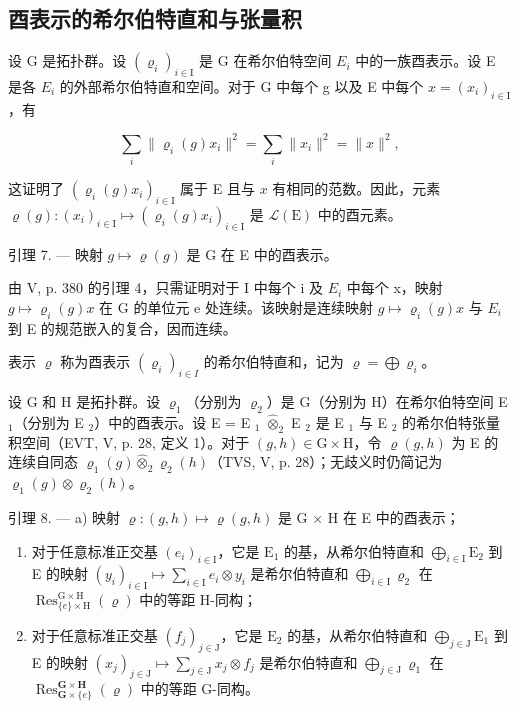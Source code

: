 \subsection{酉表示的希尔伯特直和与张量积}

设 G 是拓扑群。设 \((\varrho_{i})_{i\in\mathrm{I}}\) 是 G 在希尔伯特空间 \(E_{i}\) 中的一族酉表示。设 E 是各 \(E_{i}\) 的外部希尔伯特直和空间。对于 G 中每个 g 以及 E 中每个 \(x=(x_{i})_{i\in\mathrm{I}}\)，有

\[
\sum_ {i} \| \varrho_ {i} (g) x _ {i} \| ^ {2} = \sum_ {i} \| x _ {i} \| ^ {2} = \| x \| ^ {2},
\]

这证明了 \((\varrho_i(g)x_i)_{i\in \mathrm{I}}\) 属于 E 且与 \(x\) 有相同的范数。因此，元素 \(\varrho (g)\colon (x_{i})_{i\in \mathrm{I}}\mapsto (\varrho_{i}(g)x_{i})_{i\in \mathrm{I}}\) 是 \(\mathcal{L}(\mathrm{E})\) 中的酉元素。

引理 7. --- 映射 \(g \mapsto \varrho(g)\) 是 G 在 E 中的酉表示。

由 V, p. 380 的引理 4，只需证明对于 I 中每个 i 及 \(E_{i}\) 中每个 x，映射 \(g \mapsto \varrho_{i}(g)x\) 在 G 的单位元 e 处连续。该映射是连续映射 \(g \mapsto \varrho_{i}(g)x\) 与 \(E_{i}\) 到 E 的规范嵌入的复合，因而连续。

表示 \(\varrho\) 称为酉表示 \((\varrho_{i})_{i\in I}\) 的希尔伯特直和，记为 \(\varrho = \bigoplus \varrho_{i}\)。

设 G 和 H 是拓扑群。设 \(\varrho_{1}\)（分别为 \(\varrho_{2}\)）是 G（分别为 H）在希尔伯特空间 E \(_{1}\)（分别为 E \(_{2}\)）中的酉表示。设 E = E \(_{1}\) \(\widehat{\otimes}_{2}\) E \(_{2}\) 是 E \(_{1}\) 与 E \(_{2}\) 的希尔伯特张量积空间（EVT, V, p. 28, 定义 1）。对于 \((g,h)\in\mathrm{G}\times\mathrm{H}\)，令 \(\varrho(g,h)\) 为 E 的连续自同态 \(\varrho_{1}(g)\widehat{\otimes}_{2}\varrho_{2}(h)\)（TVS, V, p. 28）；无歧义时仍简记为 \(\varrho_{1}(g)\otimes\varrho_{2}(h)\)。

引理 8. --- a) 映射 \(\varrho\colon(g,h)\mapsto\varrho(g,h)\) 是 G × H 在 E 中的酉表示；

\begin{enumerate}
\def\labelenumi{\alph{enumi})}
\setcounter{enumi}{1}
\item
  对于任意标准正交基 \((e_i)_{i\in \mathrm{I}}\)，它是 \(\mathrm{E}_1\) 的基，从希尔伯特直和 \(\bigoplus_{i\in \mathrm{I}}\mathrm{E}_2\) 到 E 的映射 \((y_i)_{i\in \mathrm{I}}\mapsto \sum_{i\in \mathrm{I}}e_i\otimes y_i\) 是希尔伯特直和 \(\bigoplus_{i\in \mathrm{I}}\varrho_2\) 在 \(\operatorname {Res}_{\{e\} \times \mathrm{H}}^{\mathrm{G}\times \mathrm{H}}(\varrho)\) 中的等距 H-同构；
\item
  对于任意标准正交基 \((f_j)_{j\in \mathrm{J}}\)，它是 \(\mathrm{E}_2\) 的基，从希尔伯特直和 \(\bigoplus_{j\in \mathrm{J}}\mathrm{E}_1\) 到 E 的映射 \((x_{j})_{j\in \mathrm{J}}\mapsto \sum_{j\in \mathrm{J}}x_{j}\otimes f_{j}\) 是希尔伯特直和 \(\bigoplus_{j\in \mathrm{J}}\varrho_1\) 在 \(\operatorname {Res}_{\mathbf{G}\times \{e\}}^{\mathbf{G}\times \mathbf{H}}(\varrho)\) 中的等距 G-同构。
\end{enumerate}

